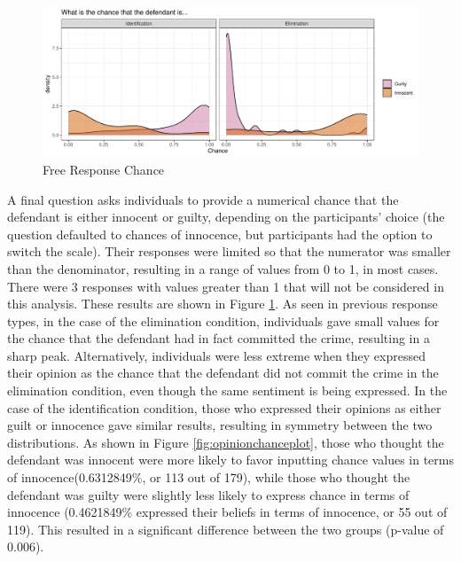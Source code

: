 \documentclass[print]{nuthesis}
\begin{document}
\begin{figure}

{\centering \includegraphics[width=\linewidth]{thesis_files/figure-latex/freelike-1} 

}

\caption{Free Response Chance}\label{fig:freelike}
\end{figure}

A final question asks individuals to provide a numerical chance that the defendant is either innocent or guilty, depending on the participants' choice (the question defaulted to chances of innocence, but participants had the option to switch the scale).
Their responses were limited so that the numerator was smaller than the denominator, resulting in a range of values from 0 to 1, in most cases.
There were 3 responses with values greater than 1 that will not be considered in this analysis.
These results are shown in Figure \ref{fig:freelike}.
As seen in previous response types, in the case of the elimination condition, individuals gave small values for the chance that the defendant had in fact committed the crime, resulting in a sharp peak.
Alternatively, individuals were less extreme when they expressed their opinion as the chance that the defendant did not commit the crime in the elimination condition, even though the same sentiment is being expressed.
In the case of the identification condition, those who expressed their opinions as either guilt or innocence gave similar results, resulting in symmetry between the two distributions.
As shown in Figure \ref{fig:opinionchanceplot}, those who thought the defendant was innocent were more likely to favor inputting chance values in terms of innocence(0.6312849\%, or 113 out of 179), while those who thought the defendant was guilty were slightly less likely to express chance in terms of innocence (0.4621849\% expressed their beliefs in terms of innocence, or 55 out of 119).
This resulted in a significant difference between the two groups (p-value of 0.006).
\end{document}

